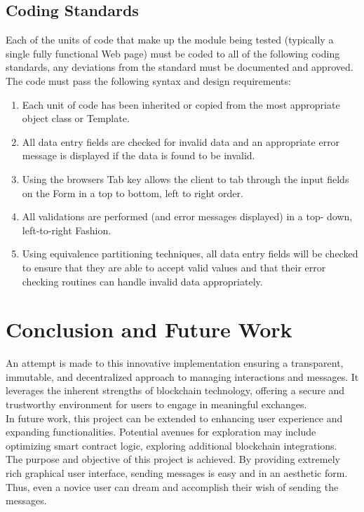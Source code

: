 \documentclass[12pt,a4paper]{article}
\begin{document}
\subsection{Coding Standards}
Each of the units of code that make up the module being tested (typically a single fully functional Web page) must be coded to all of the following coding standards, any deviations from the standard must be documented and approved.\\
The code must pass the following syntax and design requirements:
\begin{enumerate}
\item Each unit of code has been inherited or copied from the most appropriate object class or Template.
\item All data entry fields are checked for invalid data and an appropriate error message is displayed if the data is found to be invalid.
\item Using the browsers Tab key allows the client to tab through the input fields on the Form in a top to bottom, left to right order.
\item All validations are performed (and error messages displayed) in a top- down, left-to-right Fashion.
\item Using equivalence partitioning techniques, all data entry fields will be checked to ensure that they are able to accept valid values and that their error checking routines can handle invalid data appropriately.
\end{enumerate}
\newpage
\section{Conclusion and Future Work}
An attempt is made to this innovative implementation ensuring a transparent, immutable, and decentralized approach to managing interactions and messages. It leverages the inherent strengths of blockchain technology, offering a secure and trustworthy environment for users to engage in meaningful exchanges.\\

In future work, this project can be extended to enhancing user experience and expanding functionalities. Potential avenues for exploration may include optimizing smart contract logic, exploring additional blockchain integrations.\\

The purpose and objective of this project is achieved. By providing extremely rich graphical user interface, sending messages is easy and in an aesthetic form. Thus, even a novice user can dream and accomplish their wish of sending the messages.\\
\end{document}
